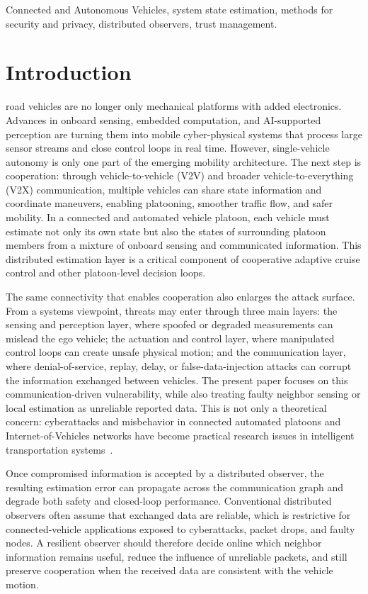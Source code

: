 \documentclass[letterpaper,journal]{IEEEtran}
\begin{document}
\begin{IEEEkeywords}
Connected and Autonomous Vehicles, system state estimation, methods for security and privacy, distributed observers, trust management.
\end{IEEEkeywords}

\section{Introduction}\label{sec_introduction}
 road vehicles are no longer only mechanical platforms with added electronics. Advances in onboard sensing, embedded computation, and AI-supported perception are turning them into mobile cyber-physical systems that process large sensor streams and close control loops in real time. However, single-vehicle autonomy is only one part of the emerging mobility architecture. The next step is cooperation: through vehicle-to-vehicle (V2V) and broader vehicle-to-everything (V2X) communication, multiple vehicles can share state information and coordinate maneuvers, enabling platooning, smoother traffic flow, and safer mobility. In a connected and automated vehicle platoon, each vehicle must estimate not only its own state but also the states of surrounding platoon members from a mixture of onboard sensing and communicated information. This distributed estimation layer is a critical component of cooperative adaptive cruise control and other platoon-level decision loops.

The same connectivity that enables cooperation also enlarges the attack surface. From a systems viewpoint, threats may enter through three main layers: the sensing and perception layer, where spoofed or degraded measurements can mislead the ego vehicle; the actuation and control layer, where manipulated control loops can create unsafe physical motion; and the communication layer, where denial-of-service, replay, delay, or false-data-injection attacks can corrupt the information exchanged between vehicles. The present paper focuses on this communication-driven vulnerability, while also treating faulty neighbor sensing or local estimation as unreliable reported data. This is not only a theoretical concern: cyberattacks and misbehavior in connected automated platoons and Internet-of-Vehicles networks have become practical research issues in intelligent transportation systems~\cite{C_IDM,mousavinejad2019distributed,siddiqui2023trust_vehicles}.

Once compromised information is accepted by a distributed observer, the resulting estimation error can propagate across the communication graph and degrade both safety and closed-loop performance. Conventional distributed observers often assume that exchanged data are reliable, which is restrictive for connected-vehicle applications exposed to cyberattacks, packet drops, and faulty nodes. A resilient observer should therefore decide online which neighbor information remains useful, reduce the influence of unreliable packets, and still preserve cooperation when the received data are consistent with the vehicle motion.
\end{document}

